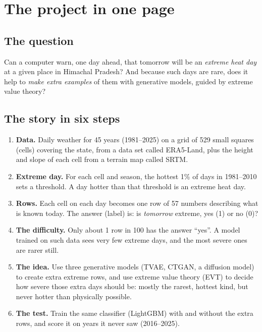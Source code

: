 \chapter{The project in one page}
\label{ch:overview}

\section*{The question}
Can a computer warn, one day ahead, that tomorrow will be an \emph{extreme heat day} at a given place in Himachal
Pradesh? And because such days are rare, does it help to \emph{make extra examples} of them with generative models,
guided by extreme value theory?

\section*{The story in six steps}
\begin{enumerate}
  \item \textbf{Data.} Daily weather for 45 years (1981--2025) on a grid of 529 small squares (cells) covering the
        state, from a data set called ERA5-Land, plus the height and slope of each cell from a terrain map called SRTM.
  \item \textbf{Extreme day.} For each cell and season, the hottest 1\% of days in 1981--2010 sets a threshold. A day
        hotter than that threshold is an extreme heat day.
  \item \textbf{Rows.} Each cell on each day becomes one row of 57 numbers describing what is known today. The answer
        (label) is: is \emph{tomorrow} extreme, yes (1) or no (0)?
  \item \textbf{The difficulty.} Only about 1 row in 100 has the answer ``yes''. A model trained on such data sees
        very few extreme days, and the most severe ones are rarer still.
  \item \textbf{The idea.} Use three generative models (TVAE, CTGAN, a diffusion model) to create extra extreme rows,
        and use extreme value theory (EVT) to decide how severe those extra days should be: mostly the rarest,
        hottest kind, but never hotter than physically possible.
  \item \textbf{The test.} Train the same classifier (LightGBM) with and without the extra rows, and score it on years
        it never saw (2016--2025).
\end{enumerate}

